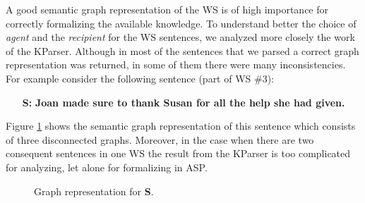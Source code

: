 A good semantic graph representation of the WS is of high importance for correctly formalizing the available knowledge. To understand better the choice of \textit{agent} and the \textit{recipient} for the WS sentences, we analyzed more closely the work of the KParser. Although in most of the sentences that we parsed a correct graph representation was returned, in some of them there were many inconsistencies. For example consider the following sentence (part of WS \#3): 
\pagebreak
\begin{itemize}
	\item[\textbf{S:}] \textbf{Joan made sure to thank Susan for all the help she had given.}
\end{itemize}
Figure \ref{Disc} shows the semantic graph representation of this sentence which consists of three disconnected graphs. Moreover, in the case when there are two consequent sentences in one WS the result from the KParser is too complicated for analyzing, let alone for formalizing in ASP. 

\begin{figure} [h!]
	\centering
	
	\caption{\label{Disc} Graph representation for \textbf{S}.}
\end{figure}
